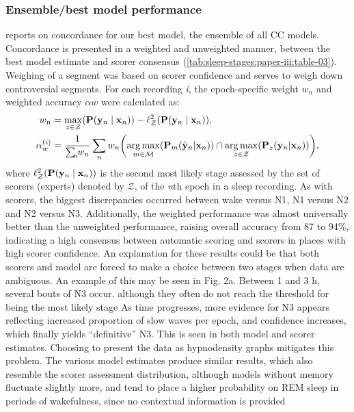 \subsubsection{Ensemble/best model performance}
 reports on concordance for our best model, the ensemble of all \ac{CC} models.
Concordance is presented in a weighted and unweighted manner, between the best model estimate and scorer consensus (\cref{tab:sleep-stages:paper-iii:table-03}).
Weighing of a segment was based on scorer confidence and serves to weigh down controversial segments.
For each recording \textit{i}, the epoch-specific weight $w_n$ and weighted accuracy $\alpha w$ were calculated as:
\begin{align}
\begin{split}
    w_n &= \func{\max_{z \in \mathcal{Z}}}{\func{\mathbf{P}}{\mathbf{y}_n \mid \mathbf{x}_n}} - \func{\ell_{\mathcal{Z}}^2}{\func{\mathbf{P}}{\mathbf{y}_n \mid \mathbf{x}_n}}, \\
    \alpha_w^{(i)} &= \frac{1}{\sum_{\mathclap{n}} w_n} \sum_n w_n \parentheses*{ \func{\argmax_{m \in \mathcal{M}}}{\func{\mathbf{P}_m}{\hat{\mathbf{y}}_n | \mathbf{x}_n}} \cap \func{\argmax_{z \in \mathcal{Z}}}{\func{\mathbf{P}_z}{\mathbf{y}_n | \mathbf{x}_n}} },
\end{split}
\end{align}
where $\func{\ell_{\mathcal{Z}}^2}{\func{\mathbf{P}}{\mathbf{y}_n \mid \mathbf{x}_n}}$ is the second most likely stage assessed by the set of scorers (experts) denoted by $\mathcal{Z}$, of the \textit{n}th epoch in a sleep recording.
As with scorers, the biggest discrepancies occurred between wake versus \ac{N1}, \ac{N1} versus \ac{N2} and \ac{N2} versus \ac{N3}.
Additionally, the weighted performance was almost universally better than the unweighted performance, raising overall accuracy from 87 to 94\%, indicating a high consensus between automatic scoring and scorers in places with high scorer confidence.
An explanation for these results could be that both scorers and model are forced to make a choice between two stages when data are ambiguous.
An example of this may be seen in Fig. 2a.
Between 1 and 3 h, several bouts of \ac{N3} occur, although they often do not reach the threshold for being the most likely stage
As time progresses, more evidence for \ac{N3} appears reflecting increased proportion of slow waves per epoch, and confidence increases, which finally yields “definitive” \ac{N3}. 
This is seen in both model and scorer estimates.
Choosing to present the data as hypnodensity graphs mitigates this problem. 
The various model estimates produce similar results, which also resemble the scorer assessment distribution, although models without memory fluctuate slightly more, and tend to place a higher probability on \ac{REM} sleep in periods of wakefulness, since no contextual information is provided

